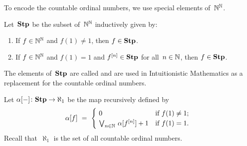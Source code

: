 \documentclass[main.tex]{subfiles}
\begin{document}
To encode the countable ordinal numbers,
we use special elements of~$\mathbb{N}^{\mathbb{N}}$.
\begin{dfn}
\label{D:bhier-stump}
Let~$\mathbf{Stp}$ be the subset  of~$\mathbb{N}^{\mathbb{N}}$
inductively given by:
\begin{enumerate}
\item
If $f\in\mathbb{N}^{\mathbb{N}}$ and $f(1)\neq 1$, then $f\in \mathbf{Stp}$.

\item
If $f\in\mathbb{N}^{\mathbb{N}}$
and $f(1)=1$
and $f^{[n]}\in\mathbf{Stp}$ for all~$n\in\mathbb{N}$,
then $f\in \mathbf{Stp}$.
\end{enumerate}
The elements of~$\mathbf{Stp}$
are called 
and are used in Intuitionistic Mathematics
as a replacement for the countable ordinal numbers.
\end{dfn}
\begin{dfn}
\label{D:bhier-alpha}
Let $\alpha[-]\colon \mathbf{Stp} \rightarrow \aleph_1$
be the map recursively defined by
\begin{equation*}
\alpha[f]\ =\ 
\begin{cases}
\ 0&
\text{if $f(1)\neq1$;}\\
\ \bv_{n\in \N}\ \alpha[f^{[n]}]+1&
\text{if $f(1)= 1$.}
\end{cases}
\end{equation*}
Recall that~$\aleph_1$
is the set of all countable ordinal numbers.
\end{dfn}
\end{document}
